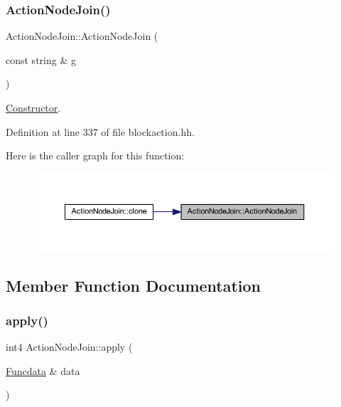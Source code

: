 \subsubsection{\texorpdfstring{ActionNodeJoin()}{ActionNodeJoin()}}
{\footnotesize\ttfamily Action\+Node\+Join\+::\+Action\+Node\+Join (\begin{DoxyParamCaption}\item[{const string \&}]{g }\end{DoxyParamCaption})\hspace{0.3cm}{\ttfamily [inline]}}



\mbox{\hyperlink{class_constructor}{Constructor}}. 



Definition at line 337 of file blockaction.\+hh.

Here is the caller graph for this function\+:
\nopagebreak
\begin{figure}[H]
\begin{center}
\leavevmode
\includegraphics[width=350pt]{class_action_node_join_a6ccac418c73801aa6e308200b7873b82_icgraph}
\end{center}
\end{figure}


\subsection{Member Function Documentation}
\mbox{\label{class_action_node_join_a1be9f170c96721c2f8770fc04b1f41df}} 
\subsubsection{\texorpdfstring{apply()}{apply()}}
{\footnotesize\ttfamily int4 Action\+Node\+Join\+::apply (\begin{DoxyParamCaption}\item[{\mbox{\hyperlink{class_funcdata}{Funcdata}} \&}]{data }\end{DoxyParamCaption})\hspace{0.3cm}{\ttfamily [virtual]}}



